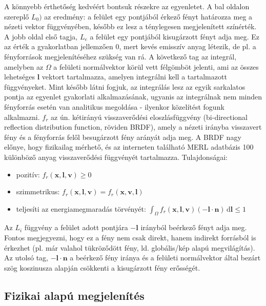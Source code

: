 \documentclass[12pt,oneside]{book}
\begin{document}
A könnyebb érthetőség kedvéért bontsuk részekre az egyenletet. A bal oldalon szereplő \(L_0)\) az eredmény: a felület egy pontjából érkező fényt határozza meg a nézeti vektor függvényében, később ez lesz a ténylegesen megjelenített színérték. A jobb oldal első tagja, \(L_e\) a felület egy pontjából kisugárzott fényt adja meg. Ez az érték a gyakorlatban jellemzően 0, mert kevés emisszív anyag létezik, de pl. a fényforrások megjelenítéséhez szükség van rá. A következő tag az integrál, amelyben az \(\Omega\) a felületi normálvektor körül vett félgömböt jelenti, ami az összes lehetséges \(\mathbf{l}\) vektort tartalmazza, amelyen integrálni kell a tartalmazott függvényeket. Mint később látni fogjuk, az integrálás lesz az egyik sarkalatos pontja az egyenlet gyakorlati alkalmazásának, ugyanis az integrálnak nem minden fényforrás esetén van analitikus megoldása - ilyenkor közelítést fogunk alkalmazni. \(f_r\) az ún. kétirányú visszaverődési eloszlásfüggvény (bi-directional reflection distribution function, röviden BRDF), amely a nézeti irányba visszavert fény és a fényforrás felől besugárzott fény arányát adja meg. A BRDF nagy előnye, hogy fizikailag mérhető, és az interneten található MERL adatbázis 100 különböző anyag visszaverődési függvényét tartalmazza. Tulajdonságai:

\begin{itemize}[noitemsep]
\item pozitív: \(f_r(\mathbf{x},\mathbf{l},\mathbf{v}) \geq 0\)
\item szimmetrikus: \(f_r(\mathbf{x},\mathbf{l},\mathbf{v}) = f_r(\mathbf{x},\mathbf{v},\mathbf{l})\)
\item teljesíti az energiamegmaradás törvényét: \(\int_\Omega f_r(\mathbf{x},\mathbf{l},\mathbf{v}) (-\mathbf{l} \cdot \mathbf{n})\,\mathrm{d}\mathbf{l} \leq 1\)
\end{itemize}

Az \(L_i\) függvény a felület adott pontjára \(-\mathbf{l}\) irányból beérkező fényt adja meg. Fontos megjegyezni, hogy ez a fény nem csak direkt, hanem indirekt forrásból is érkezhet (pl. már valahol tükröződött fény, ld. globális/kép alapú megvilágítás). Az utolsó tag, \(-\mathbf{l} \cdot \mathbf{n}\) a beérkező fény iránya és a felületi normálvektor által bezárt szög koszinusza alapján csökkenti a kisugárzott fény erősségét.

\subsection{Fizikai alapú megjelenítés}
\end{document}
